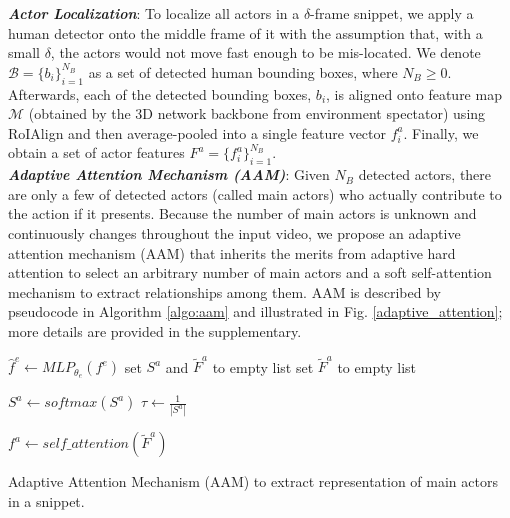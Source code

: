 \documentclass{bmvc2k}
\begin{document}
\noindent
\textit{\textbf{Actor Localization}}: 
To localize all actors in a $\delta$-frame snippet, we apply a human detector onto the middle frame of it with the assumption that, with a small $\delta$, the actors would not move fast enough to be mis-located. We denote  $\mathcal{B}=\{b_i\}_{i=1}^{N_B}$ as a set of detected human bounding boxes, where $N_B \geq 0$. Afterwards, each of the detected bounding boxes, $b_i$, is aligned onto feature map $\mathcal{M}$ (obtained by the 3D network backbone from environment spectator) using RoIAlign \cite{MaskRCNN_ICCV17} and then average-pooled into a single feature vector $f^a_i$. Finally, we obtain a set of actor features $F^a=\{f^a_i\}^{N_B}_{i=1}$. \\
\noindent
\textit{\textbf{Adaptive Attention Mechanism (AAM)}}:
Given $N_B$ detected actors, there are only a few of detected actors (called main actors) who actually contribute to the action if it presents. Because the number of main actors is unknown and continuously changes throughout the input video, we propose an adaptive attention mechanism (AAM) that inherits the merits from adaptive hard attention to select an arbitrary number of main actors and a soft self-attention mechanism \cite{attention_is_all_you_need} to extract relationships among them. AAM is described by pseudocode in Algorithm \ref{algo:aam} and illustrated in Fig. \ref{adaptive_attention}; more details are provided in the supplementary.

\begin{algorithm}[t]
\footnotesize
\DontPrintSemicolon
\SetNoFillComment
{}
$\hat{f}^e \gets MLP_{\theta_e}(f^e)$ 
set $S^a$ and $\tilde{F}^a$ to empty list 
set $\tilde{F}^a$ to empty list 

$S^a \gets softmax(S^a)$ 
$\tau \gets \frac{1}{|S^a|}$ 

$f^a \gets self\_attention(\tilde{F}^a)$ 
\caption{Adaptive Attention Mechanism (AAM) to extract representation of main actors in a snippet.}
\label{algo:aam}
\end{algorithm}
\end{document}
